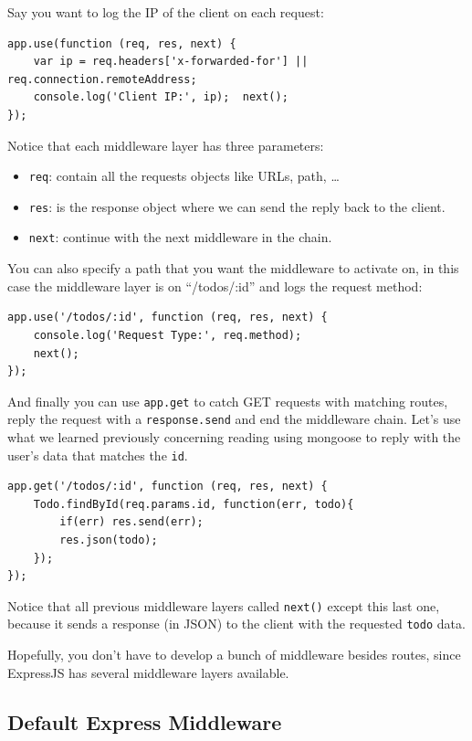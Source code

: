 \documentclass[12pt]{article}
\begin{document}
Say you want to log the IP of the client on each request:
\begin{Verbatim}
app.use(function (req, res, next) {  
	var ip = req.headers['x-forwarded-for'] || req.connection.remoteAddress;  
	console.log('Client IP:', ip);  next();
});
\end{Verbatim}
Notice that each middleware layer has three parameters:
\begin{itemize}
\item
  \texttt{req}: contain all the requests objects like URLs, path,
  \ldots{}
\item
  \texttt{res}: is the response object where we can send the reply back
  to the client.
\item
  \texttt{next}: continue with the next middleware in the chain.
\end{itemize}
You can also specify a path that you want the middleware to activate on, in this case
the middleware layer is on ``/todos/:id'' and logs the request method:
\begin{Verbatim}
app.use('/todos/:id', function (req, res, next) {  
	console.log('Request Type:', req.method);  
	next();
});
\end{Verbatim}
And finally you can use \texttt{app.get} to catch GET requests with
matching routes, reply the request with a \texttt{response.send} and end
the middleware chain. Let's use what we learned previously concerning reading using mongoose
to reply with the user's data that matches the \texttt{id}.
\begin{Verbatim}
app.get('/todos/:id', function (req, res, next) {  
	Todo.findById(req.params.id, function(err, todo){    
		if(err) res.send(err);    
		res.json(todo);  
	});
});
\end{Verbatim}
Notice that all previous middleware layers called \texttt{next()} except this
last one, because it sends a response (in JSON) to the client with the
requested \texttt{todo} data.

Hopefully, you don't have to develop a bunch of middleware besides
routes, since ExpressJS has several middleware layers available.

\subsection{Default Express Middleware}
	
\end{document}
